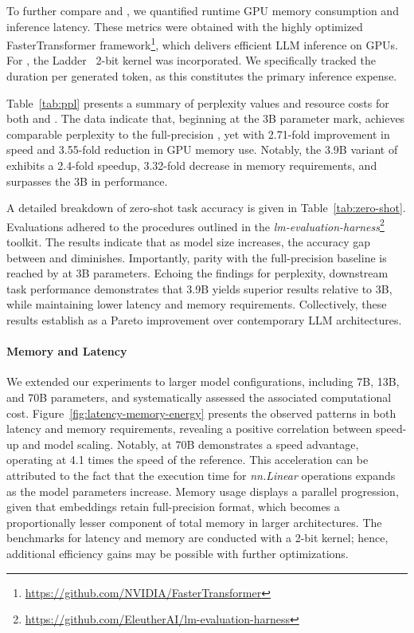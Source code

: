 To further compare  and , we quantified runtime GPU memory consumption and inference latency. These metrics were obtained with the highly optimized FasterTransformer framework\footnote{\url{https://github.com/NVIDIA/FasterTransformer}}, which delivers efficient LLM inference on GPUs. For , the Ladder~\cite{ladder} 2-bit kernel was incorporated. We specifically tracked the duration per generated token, as this constitutes the primary inference expense.

Table~\ref{tab:ppl} presents a summary of perplexity values and resource costs for both  and . The data indicate that, beginning at the 3B parameter mark,  achieves comparable perplexity to the full-precision , yet with 2.71-fold improvement in speed and 3.55-fold reduction in GPU memory use. Notably, the 3.9B variant of  exhibits a 2.4-fold speedup, 3.32-fold decrease in memory requirements, and surpasses the 3B  in performance.

A detailed breakdown of zero-shot task accuracy is given in Table~\ref{tab:zero-shot}. Evaluations adhered to the procedures outlined in the \emph{lm-evaluation-harness}\footnote{\url{https://github.com/EleutherAI/lm-evaluation-harness}} toolkit. The results indicate that as model size increases, the accuracy gap between  and  diminishes. Importantly, parity with the full-precision baseline is reached by  at 3B parameters. Echoing the findings for perplexity, downstream task performance demonstrates that  3.9B yields superior results relative to  3B, while maintaining lower latency and memory requirements. Collectively, these results establish  as a Pareto improvement over contemporary LLM architectures.

\paragraph{Memory and Latency}

We extended our experiments to larger model configurations, including 7B, 13B, and 70B parameters, and systematically assessed the associated computational cost. Figure~\ref{fig:latency-memory-energy} presents the observed patterns in both latency and memory requirements, revealing a positive correlation between speed-up and model scaling. Notably,  at 70B demonstrates a speed advantage, operating at 4.1 times the speed of the  reference. This acceleration can be attributed to the fact that the execution time for \emph{nn.Linear} operations expands as the model parameters increase. Memory usage displays a parallel progression, given that embeddings retain full-precision format, which becomes a proportionally lesser component of total memory in larger architectures. The benchmarks for latency and memory are conducted with a 2-bit kernel; hence, additional efficiency gains may be possible with further optimizations.


